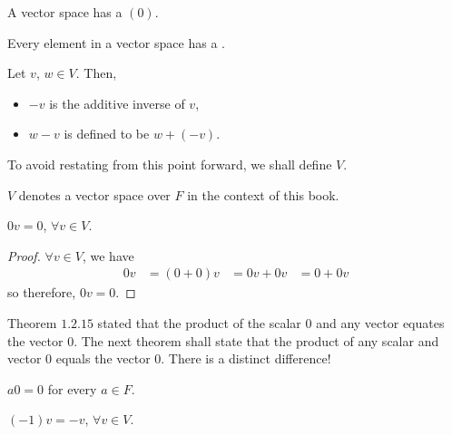 \begin{theorem}
  A vector space has a  $(0)$. 
\end{theorem}

\begin{theorem}
  Every element in a vector space has a .
\end{theorem}

\begin{definition}[$-v$, $w - v$]
  Let $v$, $w \in V$. Then,
  \begin{itemize}
    \item $-v$ is the additive inverse of $v$, 
    \item $w - v$ is defined to be $w + (-v)$.
  \end{itemize}
\end{definition}

To avoid restating from this point forward, we shall define $V$.

\begin{definition}[$V$ notation]
  $V$ denotes a vector space over $F$ in the context of this book.
\end{definition}

\begin{theorem}
  $0v = 0$, $\forall v \in V$.
\end{theorem}

\begin{proof}
  $\forall v \in V$, we have
  \begin{align*}
    0v &= (0 + 0)v
       &= 0v + 0v
       &= 0 + 0v
  \end{align*}
  so therefore, $\boxed{0v = 0}$.
\end{proof}

Theorem $1.2.15$ stated that the product of the scalar $0$ and any vector equates the vector $0$.
The next theorem shall state that the product of any scalar and vector $0$ equals the vector $0$.
There is a distinct difference!

\begin{theorem}
  $a0 = 0$ for every $a \in F$.
\end{theorem}

\begin{theorem}
  $(-1)v = -v$, $\forall v \in V$.
\end{theorem}

